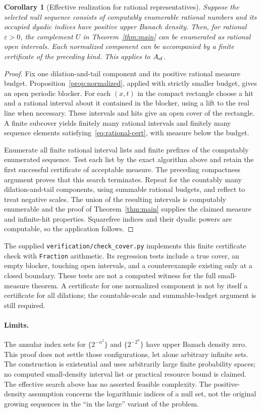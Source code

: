 \documentclass[11pt]{article}
\newtheorem{corollary}[theorem]{Corollary}
\theoremstyle{remark}\newtheorem{remark}[theorem]{Remark}
\begin{document}
\begin{corollary}[Effective realization for rational representatives]
Suppose the selected null sequence consists of computably enumerable
rational numbers and its occupied dyadic indices have positive upper
Banach density. Then, for rational $\varepsilon>0$, the complement $U$
in Theorem~\ref{thm:main} can be enumerated as rational open intervals.
Each normalized component can be accompanied by a finite certificate
of the preceding kind. This applies to $A_{\rm sf}$.
\end{corollary}
\begin{proof}
Fix one dilation-and-tail component and its positive rational measure
budget. Proposition~\ref{prop:normalized}, applied with strictly smaller
budget, gives an open periodic blocker. For each $(x,t)$ in the compact
rectangle choose a hit and a rational interval about it contained in the
blocker, using a lift to the real line when necessary. These intervals
and hits give an open cover of the rectangle. A finite subcover yields
finitely many rational intervals and finitely many sequence elements
satisfying~\eqref{eq:rational-cert}, with measure below the budget.

Enumerate all finite rational interval lists and finite prefixes of the
computably enumerated sequence. Test each list by the exact algorithm
above and retain the first successful certificate of acceptable measure.
The preceding compactness argument proves that this search terminates.
Repeat for the countably many dilation-and-tail components, using
summable rational budgets, and reflect to treat negative scales.
The union of the resulting intervals is computably enumerable and the
proof of Theorem~\ref{thm:main} supplies the claimed measure and
infinite-hit properties. Squarefree indices and their dyadic powers
are computable, so the application follows.
\end{proof}

The supplied \texttt{verification/check\_cover.py} implements this finite
certificate check with \texttt{Fraction} arithmetic. Its regression tests
include a true cover, an empty blocker, touching open intervals, and a
counterexample existing only at a closed boundary. These tests are not a
computed witness for the full small-measure theorem. A certificate for
one normalized component is not by itself a certificate for all dilations;
the countable-scale and summable-budget argument is still required.

\paragraph{Limits.}
The annular index sets for $\{2^{-n^2}\}$ and $\{2^{-2^n}\}$ have upper Banach density zero. This proof does not settle those configurations, let alone arbitrary infinite sets. The construction is existential and uses arbitrarily large finite probability spaces; no computed small-density interval list or practical resource bound is claimed. The effective search above has no asserted feasible complexity. The positive-density assumption concerns the logarithmic indices of a null set, not the original growing sequences in the ``in the large'' variant of the problem.
\end{document}
